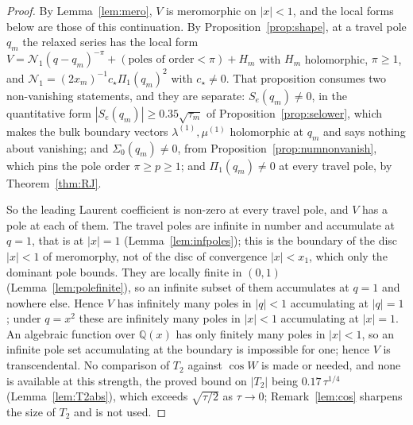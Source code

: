 \documentclass[11pt]{article}
\theoremstyle{plain}
\theoremstyle{definition}
\theoremstyle{remark}
\newcommand{\Q}{\mathbb{Q}}
\begin{document}
\begin{proof}
By Lemma~\ref{lem:mero}, $V$ is meromorphic on $|x|<1$, and the local forms below are those of
this continuation. By Proposition~\ref{prop:shape}, at a travel pole $q_m$ the relaxed series has the local form
$V=\mathcal N_1(q-q_m)^{-\pi}+(\text{poles of order}<\pi)+H_m$ with $H_m$ holomorphic, $\pi\ge1$,
and $\mathcal N_1=(2x_m)^{-1}c_\star\Pi_1(q_m)^2$ with $c_\star\ne0$. That proposition consumes two
non-vanishing statements, and they are separate: $S_e(q_m)\ne0$, in the quantitative form
$|S_e(q_m)|\ge0.35\sqrt{\tau_m}$ of Proposition~\ref{prop:selower}, which makes the bulk boundary
vectors $\lambda^{(1)},\mu^{(1)}$ holomorphic at $q_m$ and says nothing about vanishing; and
$\Sigma_0(q_m)\ne0$, from Proposition~\ref{prop:numnonvanish}, which pins the pole order
$\pi\ge p\ge1$; and $\Pi_1(q_m)\ne0$ at every travel pole, by Theorem~\ref{thm:RJ}.

So the leading Laurent coefficient is non-zero at every travel pole, and $V$ has a pole at each of
them. The travel poles are infinite in number and accumulate at $q=1$, that is at $|x|=1$
(Lemma~\ref{lem:infpoles}); this is the boundary of the disc $|x|<1$ of meromorphy, not of the disc
of convergence $|x|<x_1$, which only the dominant pole bounds. They are locally finite in $(0,1)$
(Lemma~\ref{lem:polefinite}), so an infinite subset of them accumulates at $q=1$ and nowhere else.
Hence $V$ has infinitely many poles in $|q|<1$ accumulating at $|q|=1$; under $q=x^2$ these are
infinitely many poles in $|x|<1$ accumulating at $|x|=1$. An algebraic function over $\Q(x)$ has
only finitely many poles in $|x|<1$, so an infinite pole set accumulating at the boundary is
impossible for one; hence $V$ is transcendental. No comparison of $T_2$ against $\cos W$ is made or
needed, and none is available at this strength, the proved bound on $|T_2|$ being
$0.17\,\tau^{1/4}$ (Lemma~\ref{lem:T2abs}), which exceeds $\sqrt{\tau/2}$ as $\tau\to0$;
Remark~\ref{lem:cos} sharpens the size of $T_2$ and is not used.
\end{proof}
\end{document}
